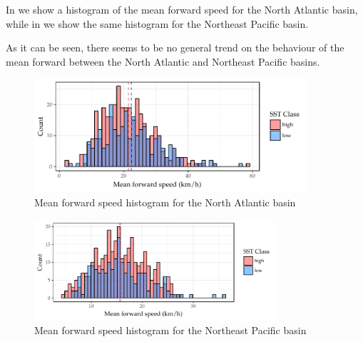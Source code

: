 \medskip
In  we show a histogram of the mean forward speed for the North Atlantic basin, while in  we show the same histogram for the Northeast Pacific basin.

As it can be seen, there seems to be no general trend on the behaviour of the mean forward between the North Atlantic and Northeast Pacific basins.
\begin{figure}[H]
	\centering
	\includegraphics[width=0.9\textwidth]{images/natl-forward-speed}
	\caption{Mean forward speed histogram for the North Atlantic basin}
	\label{fig:natl-forward-speed}
\end{figure}

\begin{figure}[H]
	\centering
	\includegraphics[width=0.8\textwidth]{images/epac-forward-speed}
	\caption{Mean forward speed histogram for the Northeast Pacific basin}
	\label{fig:epac-forward-speed}
\end{figure}
